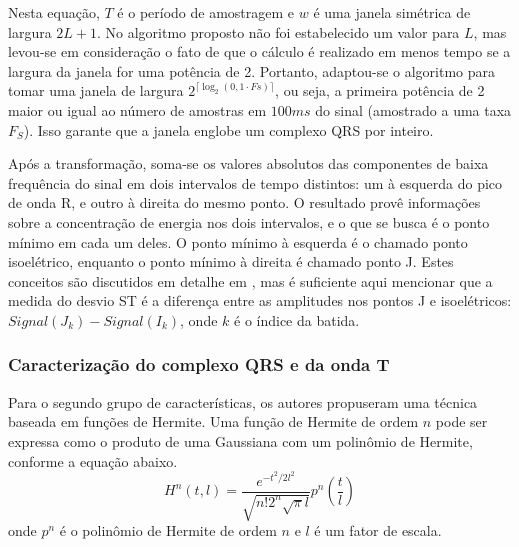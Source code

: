 Nesta equação, $T$ é o período de amostragem e $w$ é uma janela simétrica de largura $2L+1$. No algoritmo proposto não foi estabelecido um valor para $L$, mas levou-se em consideração o fato de que o cálculo é realizado em menos tempo se a largura da janela for uma potência de 2. Portanto, adaptou-se o algoritmo para tomar uma janela de largura $2^{\lceil\log_2(0,1\cdot Fs)\rceil}$, ou seja, a primeira potência de 2 maior ou igual ao número de amostras em $100ms$ do sinal (amostrado a uma taxa $F_S$). Isso garante que a janela englobe um complexo QRS por inteiro.

Após a transformação, soma-se os valores absolutos das componentes de baixa frequência do sinal em dois intervalos de tempo distintos: um à esquerda do pico de onda R, e outro à direita do mesmo ponto. O resultado provê informações sobre a concentração de energia nos dois intervalos, e o que se busca é o ponto mínimo em cada um deles. O ponto mínimo à esquerda é o chamado ponto isoelétrico, enquanto o ponto mínimo à direita é chamado ponto J. Estes conceitos são discutidos em detalhe em \cite{Rocha10}, mas é suficiente aqui mencionar que a medida do desvio ST é a diferença entre as amplitudes nos pontos J e isoelétricos: $Signal(J_k) - Signal(I_k)$, onde $k$ é o índice da batida.

\subsubsection{Caracterização do complexo QRS e da onda T}
Para o segundo grupo de características, os autores propuseram uma técnica baseada em funções de Hermite. Uma função de Hermite de ordem $n$ pode ser expressa como o produto de uma Gaussiana com um polinômio de Hermite, conforme a equação abaixo.
\begin{equation} \label{equ:hermite_function}
    H^n(t,l) = \frac{e^{-t^2/2l^2}}{\sqrt{n!2^n\sqrt{\pi}l}}p^n\left(\frac{t}{l}\right)
\end{equation}
onde $p^n$ é o polinômio de Hermite de ordem $n$ e $l$ é um fator de escala.

